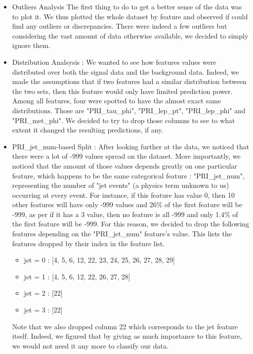 \documentclass[10pt,conference,compsocconf]{IEEEtran}
\begin{document}
\begin{itemize}
\item Outliers Analysis
The first thing to do to get a better sense of the data was to plot it. We thus plotted the whole dataset by feature and observed if could find any outliers or discrepancies. There were indeed a few outliers but considering the vast amount of data otherwise available, we decided to simply ignore them.

\item Distribution Analsysis :
We wanted to see how features values were distributed over both the signal data and the background data. Indeed, we made the assumptions that if two features had a similar distribution between the two sets, then this feature would only have limited prediction power. Among all features, four were spotted to have the almost exact same distributions. Those are "PRI\_tau\_phi", "PRI\_lep\_pt", "PRI\_lep\_phi" and "PRI\_met\_phi". We decided to try to drop those columns to see to what extent it changed the resulting predictions, if any.

\item PRI\_jet\_num-based Split :
After looking further at the data, we noticed that there were a lot of -999 values spread on the dataset. More importantly, we noticed that the amount of those values depends greatly on one particular feature, which happens to be the same categorical feature : "PRI\_jet\_num", representing the number of "jet events" (a physics term unknown to us) occurring at every event. For instance, if this feature has value 0, then 10 other features will have only -999 values and 26\% of the first feature will be -999, as per if it has a 3 value, then no feature is all -999 and only 1.4\% of the first feature will be -999.
For this reason, we decided to drop the following features depending on the "PRI\_jet\_num" feature's value. This lists the features dropped by their index in the feature list.
\begin{itemize}
\item jet = 0 : [4, 5, 6, 12, 22, 23, 24, 25, 26, 27, 28, 29]
\item jet = 1 : [4, 5, 6, 12, 22, 26, 27, 28]
\item jet = 2 : [22]
\item jet = 3 : [22]
\end{itemize}
Note that we also dropped column 22 which corresponds to the jet feature itself. Indeed, we figured that by giving as much importance to this feature, we would not need it any more to classify our data.


\end{itemize}
\end{document}
